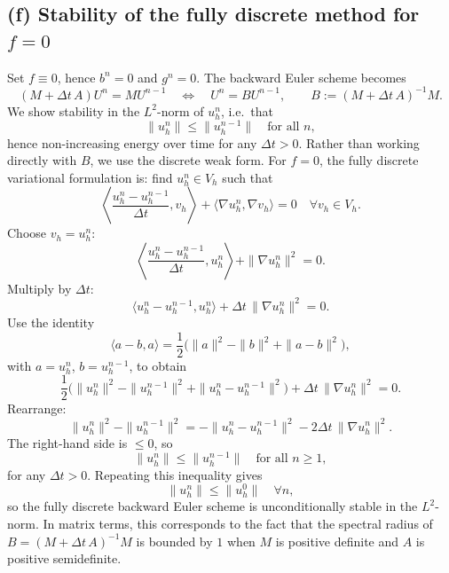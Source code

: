 \subsection*{(f) Stability of the fully discrete method for $f=0$}
Set $f\equiv 0$, hence $b^n = 0$ and $g^n = 0$. The backward Euler scheme becomes
\[
    (M + \Delta t\,A) U^n = M U^{n-1}
    \quad\Leftrightarrow\quad
    U^n = B U^{n-1},\qquad B := (M + \Delta t\,A)^{-1}M.
\]
We show stability in the $L^2$-norm of $u_h^n$, i.e.\ that
\[
    \|u_h^n\| \le \|u_h^{n-1}\| \quad \text{for all }n,
\]
hence non-increasing energy over time for any $\Delta t > 0$.
Rather than working directly with $B$, we use the discrete weak form.
For $f=0$, the fully discrete variational formulation is: find $u_h^n\in V_h$ such that
\[
    \left\langle \frac{u_h^n - u_h^{n-1}}{\Delta t}, v_h\right\rangle
    + \langle \nabla u_h^n,\nabla v_h\rangle = 0
    \quad \forall v_h\in V_h.
\]
Choose $v_h = u_h^n$:
\[
    \left\langle \frac{u_h^n - u_h^{n-1}}{\Delta t}, u_h^n\right\rangle
    + \|\nabla u_h^n\|^2 = 0.
\]
Multiply by $\Delta t$:
\[
    \langle u_h^n - u_h^{n-1}, u_h^n\rangle
    + \Delta t\,\|\nabla u_h^n\|^2 = 0.
\]
Use the identity
\[
    \langle a-b,a\rangle
    = \frac{1}{2}\bigl(\|a\|^2 - \|b\|^2 + \|a-b\|^2\bigr),
\]
with $a=u_h^n$, $b=u_h^{n-1}$, to obtain
\[
    \frac{1}{2}\bigl(\|u_h^n\|^2 - \|u_h^{n-1}\|^2 + \|u_h^n - u_h^{n-1}\|^2\bigr)
    + \Delta t\,\|\nabla u_h^n\|^2 = 0.
\]
Rearrange:
\[
    \|u_h^n\|^2 - \|u_h^{n-1}\|^2
    = -\|u_h^n - u_h^{n-1}\|^2 - 2\Delta t\,\|\nabla u_h^n\|^2.
\]
The right-hand side is $\le 0$, so
\[
    \boxed{
        \|u_h^n\| \le \|u_h^{n-1}\| \quad \text{for all } n\ge 1,
    }
\]
for any $\Delta t >0$. Repeating this inequality gives
\[
    \|u_h^n\| \le \|u_h^0\| \quad \forall n,
\]
so the fully discrete backward Euler scheme is unconditionally stable in the $L^2$-norm.
In matrix terms, this corresponds to the fact that the spectral radius of
$B = (M + \Delta t\,A)^{-1}M$ is bounded by $1$ when $M$ is positive
definite and $A$ is positive semidefinite.

